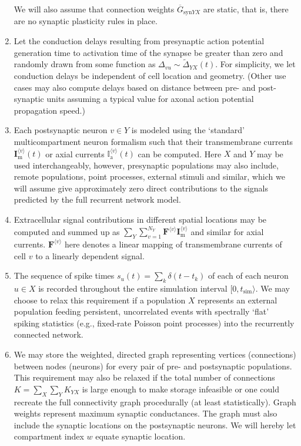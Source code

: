 \begin{enumerate}
We will also assume that connection weights $\overline{G}_{\mathrm{syn}YX}$ are static, 
that is, there are no synaptic plasticity rules in place.
\item Let the conduction delays resulting from presynaptic action potential generation time  to activation time of the synapse be greater than zero and randomly drawn from some function as $\Delta_{vu} \sim \widetilde{\Delta}_{YX}(t)$.
For simplicity, we let conduction delays be independent of cell location and geometry.
(Other use cases may also compute delays based on distance between pre- and post-synaptic units assuming a typical value for axonal action potential propagation speed.)
\item Each postsynaptic neuron $v \in Y$ is modeled using the  `standard' multicompartment neuron formalism such that their transmembrane currents $\mathbf{I}_\mathrm{m}^{\langle v \rangle}(t)$ or axial currents $\mathbb{I}_\mathrm{a}^{\langle v \rangle}(t)$ can be computed.
Here $X$ and $Y$ may be used interchangeably, however,
presynaptic populations may also include, remote populations, point processes, external stimuli and similar,
which we will assume give approximately zero direct contributions to the signals predicted by the full recurrent network model.
\item Extracellular signal contributions in different spatial locations may be computed and summed up as
$\sum_Y \sum_{v=1}^{N_Y} \mathbf{F}^{\langle v \rangle} \mathbf{I}_\mathrm{m}^{\langle v \rangle}$ and similar for axial currents.
$\mathbf{F}^{\langle v \rangle}$ here denotes a linear mapping of transmembrane currents of cell $v$ to a linearly dependent signal.
\item The sequence of spike times $s_u(t) = \sum_k \delta (t - t_k)$ of each of each neuron $u \in X$ is recorded throughout the entire simulation interval $[0, t_\mathrm{sim} \rangle$.
We may choose to relax this requirement if a population $X$ represents an external population feeding persistent, uncorrelated events with spectrally `flat' spiking statistics (e.g., fixed-rate Poisson point processes) into the recurrently connected network.
\item We may store the weighted, directed graph representing vertices (connections) between nodes (neurons) for every pair of pre- and postsynaptic populations.
This requirement may also be relaxed if the total number of connections $K = \sum_X \sum_Y K_{YX}$ is large enough to make storage infeasible or one could recreate the full connectivity graph procedurally (at least statistically).
Graph weights represent maximum synaptic conductances.
The graph must also include the synaptic locations on the postsynaptic neurons. 
We will hereby let compartment index $w$ equate synaptic location.
\end{enumerate}


